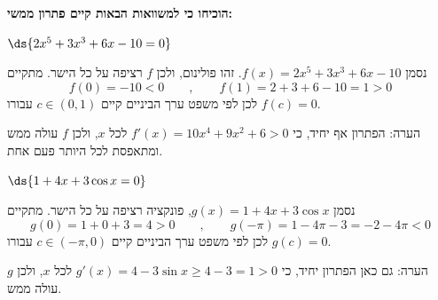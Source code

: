 \textbf{הוכיחו כי למשוואות הבאות קיים פתרון ממשי:}
\bE{}
\item $\ds{ 2x^5 + 3x^3 + 6x - 10 = 0} $
\begin{solbox}
\unverified
נסמן
$f(x)=2x^5 + 3x^3 + 6x - 10$.
זהו פולינום, ולכן
$f$
רציפה על כל הישר. מתקיים
$$f(0)=-10<0\qquad,\qquad f(1)=2+3+6-10=1>0$$
לכן לפי משפט ערך הביניים קיים
$c\in(0,1)$
עבורו
$f(c)=0$.

הערה: הפתרון אף יחיד, כי
$f'(x)=10x^4+9x^2+6>0$
לכל
$x$,
ולכן
$f$
עולה ממש ומתאפסת לכל היותר פעם אחת.
\end{solbox}
\item $\ds{1 + 4x + 3\cos x = 0}$
\begin{solbox}
\unverified
נסמן
$g(x)=1 + 4x + 3\cos x$,
פונקציה רציפה על כל הישר. מתקיים
$$g(0)=1+0+3=4>0\qquad,\qquad g(-\pi)=1-4\pi-3=-2-4\pi<0$$
לכן לפי משפט ערך הביניים קיים
$c\in(-\pi,0)$
עבורו
$g(c)=0$.

הערה: גם כאן הפתרון יחיד, כי
$g'(x)=4-3\sin x\geq 4-3=1>0$
לכל
$x$,
ולכן
$g$
עולה ממש.
\end{solbox}
\eMs
\eE
